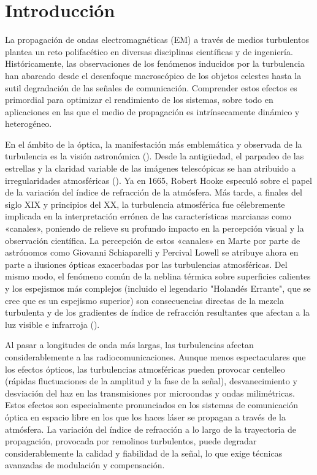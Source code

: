 \section{Introducción}

La propagación de ondas electromagnéticas (EM) a través de medios turbulentos plantea un reto polifacético en diversas disciplinas científicas y de ingeniería. Históricamente, las observaciones de los fenómenos inducidos por la turbulencia han abarcado desde el desenfoque macroscópico de los objetos celestes hasta la sutil degradación de las señales de comunicación. Comprender estos efectos es primordial para optimizar el rendimiento de los sistemas, sobre todo en aplicaciones en las que el medio de propagación es intrínsecamente dinámico y heterogéneo.

En el ámbito de la óptica, la manifestación más emblemática y observada de la turbulencia es la visión astronómica (\cite{tubbs_lucky_2003}). Desde la antigüedad, el parpadeo de las estrellas y la claridad variable de las imágenes telescópicas se han atribuido a irregularidades atmosféricas (\cite{noauthor_mystery_1994}). Ya en 1665, Robert Hooke especuló sobre el papel de la variación del índice de refracción de la atmósfera. Más tarde, a finales del siglo XIX y principios del XX, la turbulencia atmosférica fue célebremente implicada en la interpretación errónea de las características marcianas como «canales», poniendo de relieve su profundo impacto en la percepción visual y la observación científica. La percepción de estos «canales» en Marte por parte de astrónomos como Giovanni Schiaparelli y Percival Lowell se atribuye ahora en parte a ilusiones ópticas exacerbadas por las turbulencias atmosféricas. Del mismo modo, el fenómeno común de la neblina térmica sobre superficies calientes y los espejismos más complejos (incluido el legendario "Holandés Errante", que se cree que es un espejismo superior) son consecuencias directas de la mezcla turbulenta y de los gradientes de índice de refracción resultantes que afectan a la luz visible e infrarroja (\cite{young_mirages_nodate}).

Al pasar a longitudes de onda más largas, las turbulencias afectan considerablemente a las radiocomunicaciones. Aunque menos espectaculares que los efectos ópticos, las turbulencias atmosféricas pueden provocar centelleo (rápidas fluctuaciones de la amplitud y la fase de la señal), desvanecimiento y desviación del haz en las transmisiones por microondas y ondas milimétricas. Estos efectos son especialmente pronunciados en los sistemas de comunicación óptica en espacio libre en los que los haces láser se propagan a través de la atmósfera. La variación del índice de refracción a lo largo de la trayectoria de propagación, provocada por remolinos turbulentos, puede degradar considerablemente la calidad y fiabilidad de la señal, lo que exige técnicas avanzadas de modulación y compensación.

